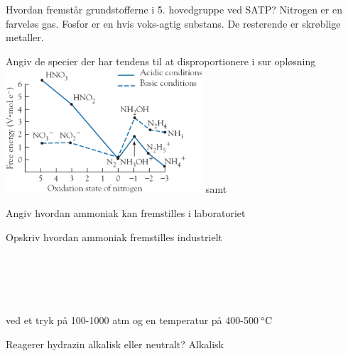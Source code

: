 
\begin{flashcard}[Egenskab]{Hvordan fremstår grundstofferne i 5. hovedgruppe ved SATP?}
Nitrogen er en farveløs gas. Fosfor er en hvis voks-agtig substans. De resterende er skrøblige metaller.
\end{flashcard}

\begin{flashcard}[Teori]{Angiv de specier der har tendens til at disproportionere i sur opløsning\\
\includegraphics[width=0.55\textwidth]{figures/k15s368FrostDiagram.png}
}
 samt 
\end{flashcard}

\begin{flashcard}[Fremstilling]{Angiv hvordan ammoniak kan fremstilles i laboratoriet}
\end{flashcard}

\begin{flashcard}[Fremstilling]{Opskriv hvordan ammoniak fremstilles industrielt}
\\
\\
\\
\\
\\
\\ \vspace{7pt}
ved et tryk på 100-1000 atm og en temperatur på 400-500$\,^{\circ}{\rm C}$
\end{flashcard}

\begin{flashcard}[Egenskab]{Reagerer hydrazin alkalisk eller neutralt?}
Alkalisk\\ \vspace{7pt}
\end{flashcard}


